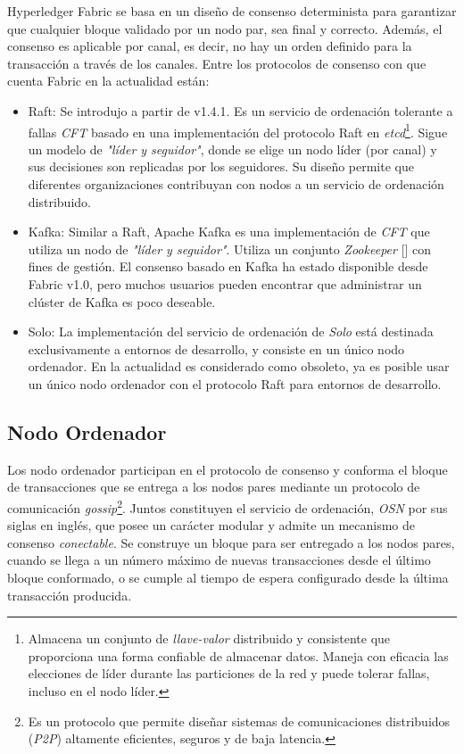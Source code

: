 Hyperledger Fabric se basa en un dise\~no de consenso determinista para garantizar que cualquier bloque validado por un nodo par, sea final y correcto.  Adem\'as, el consenso es aplicable por canal, es decir, no hay un orden definido para la transacci\'on a trav\'es de los canales.
Entre los protocolos de consenso con que cuenta Fabric en la actualidad est\'an:
\begin{itemize}
\item Raft: Se introdujo a partir de v1.4.1. Es un servicio de ordenaci\'on tolerante a fallas \emph{CFT} basado en una implementaci\'on del protocolo Raft en \emph{etcd}\footnote{Almacena un conjunto de \emph{llave-valor} distribuido y consistente que proporciona una forma confiable de almacenar datos. Maneja con eficacia las elecciones de l\'ider durante las particiones de la red y puede tolerar fallas, incluso en el nodo l\'ider.}. Sigue un modelo de \emph{"l\'ider y seguidor"}, donde se elige un nodo l\'ider (por canal) y sus decisiones son replicadas por los seguidores. Su dise\~no permite que diferentes organizaciones contribuyan con nodos a un servicio de ordenaci\'on distribuido.

\item Kafka: Similar a Raft, Apache Kafka es una implementaci\'on de \emph{CFT} que utiliza un nodo de \emph{"l\'ider y seguidor"}. Utiliza un conjunto \emph{Zookeeper} [\cite{junqueira2013zookeeper}] con fines de gesti\'on. El consenso basado en Kafka ha estado disponible desde Fabric v1.0, pero muchos usuarios pueden encontrar que administrar un cl\'uster de Kafka es poco deseable.

\item Solo: La implementaci\'on del servicio de ordenaci\'on de \emph{Solo} est\'a destinada exclusivamente a entornos de desarrollo, y consiste en un \'unico nodo ordenador. En la actualidad es considerado como obsoleto, ya es posible usar un \'unico nodo ordenador con el protocolo Raft para entornos de desarrollo. 
\end{itemize}

\subsection{Nodo Ordenador}
Los nodo ordenador participan en el protocolo de consenso y conforma el bloque de transacciones que se entrega a los nodos pares mediante un protocolo de comunicaci\'on \emph{gossip}\footnote{Es un protocolo que permite dise\~nar sistemas de comunicaciones distribuidos (\emph{P2P}) altamente eficientes, seguros y de baja latencia.}. Juntos constituyen el servicio de ordenaci\'on, \emph{OSN} por sus siglas en ingl\'es, que posee un car\'acter modular y admite un mecanismo de consenso \emph{conectable}. Se construye un bloque para ser entregado a los nodos pares, cuando se llega a un n\'umero m\'aximo de nuevas transacciones desde el \'ultimo bloque conformado, o se cumple al tiempo de espera configurado desde la \'ultima transacci\'on producida.

